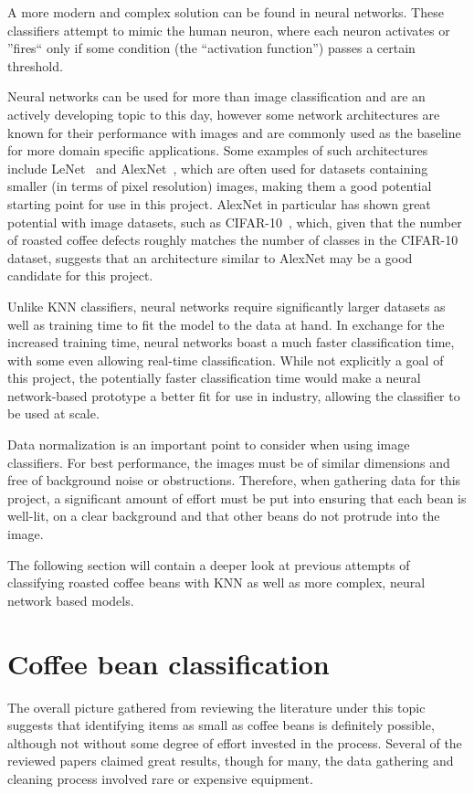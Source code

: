 A more modern and complex solution can be found in neural networks.
These classifiers
attempt to mimic the human neuron, where each neuron activates or ''fires`` only
if some condition (the ``activation function'') passes a certain threshold.

Neural networks can be used for more than image classification and are an
actively developing topic to this day, however some network architectures are known
for their performance with images and are commonly used as the baseline for more
domain specific applications.
Some examples of such architectures include LeNet~\cite{leNetOverview}
and AlexNet~\cite{alexNetOverview}, which are often used for datasets containing
smaller (in terms of pixel resolution) images, making them a good potential
starting point for use in this project.
AlexNet in particular has shown great potential
with image datasets, such as CIFAR-10~\cite{cifar10}, which, given that the
number of roasted coffee defects roughly matches the number of classes in the
CIFAR-10 dataset, suggests that an architecture similar to AlexNet may be a good
candidate for this project.

Unlike KNN classifiers, neural networks require significantly larger datasets as
well as training time to fit the model to the data at hand.
In exchange for the increased
training time, neural networks boast a much faster classification time, with some
even allowing real-time classification.
While not explicitly a goal of this
project, the potentially faster classification time would make a neural network-based
prototype a better fit for use in industry, allowing the classifier to be used
at scale.

Data normalization is an important point to consider when using image
classifiers.
For best performance, the images must be of similar dimensions and
free of background noise or obstructions.
Therefore, when gathering data for
this project, a significant amount of effort must be put into ensuring that each
bean is well-lit, on a clear background and that other beans do not protrude
into the image.

The following section will contain a deeper look at previous attempts of
classifying roasted coffee beans with KNN as well as more complex, neural network
based models.

\section{Coffee bean classification}
\label{sec:lit-review-coffee} The overall picture gathered from reviewing the literature
under this topic suggests that identifying items as small as coffee beans is definitely
possible, although not without some degree of effort invested in the process.
Several
of the reviewed papers claimed great results, though for many, the data gathering
and cleaning process involved rare or expensive equipment.

